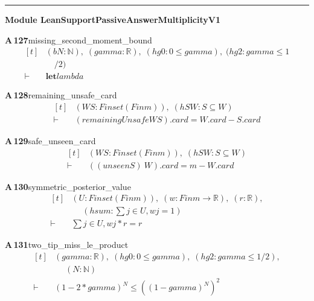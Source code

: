 \documentclass[conference]{IEEEtran}
\theoremstyle{definition}
\newcommand{\lean}[1]{\textsf{\footnotesize #1}}
\begin{document}
\vspace{4pt}\noindent\rule{\columnwidth}{0.4pt}\par\vspace{2pt}
\noindent\textbf{Module \lean{LeanSupportPassiveAnswerMultiplicityV1}}\par\vspace{3pt}

\noindent\textbf{A\,127}\quad\lean{missing\_second\_moment\_bound}
{\footnotesize\[ \begin{aligned}[t]
&(\mathit{b} \mathit{N} : \mathbb{N} ),\; (\mathit{gamma} : \mathbb{R} ),\; (\mathit{hg0} : 0\leq \mathit{gamma}),\; (\mathit{hg2} : \mathit{gamma}\leq 1\\
&\quad /2)\\
\vdash\;&\mathbf{let} \mathit{lambda}
\end{aligned} \]}

\noindent\textbf{A\,128}\quad\lean{remaining\_unsafe\_card}
{\footnotesize\[ \begin{aligned}[t]
&(\mathit{W} \mathit{S} : \mathit{Finset} (\mathit{Fin} \mathit{m})),\; (\mathit{hSW} : \mathit{S} \subseteq \mathit{W})\\
\vdash\;&(\mathit{remainingUnsafe} \mathit{W} \mathit{S}).\mathit{card}=\mathit{W}.\mathit{card}-\mathit{S}.\mathit{card}
\end{aligned} \]}

\noindent\textbf{A\,129}\quad\lean{safe\_unseen\_card}
{\footnotesize\[ \begin{aligned}[t]
&(\mathit{W} \mathit{S} : \mathit{Finset} (\mathit{Fin} \mathit{m})),\; (\mathit{hSW} : \mathit{S} \subseteq \mathit{W})\\
\vdash\;&((\mathit{unseen} \mathit{S}) \ \mathit{W}).\mathit{card}=\mathit{m}-\mathit{W}.\mathit{card}
\end{aligned} \]}

\noindent\textbf{A\,130}\quad\lean{symmetric\_posterior\_value}
{\footnotesize\[ \begin{aligned}[t]
&(\mathit{U} : \mathit{Finset} (\mathit{Fin} \mathit{m})),\; (\mathit{w} : \mathit{Fin} \mathit{m} \to \mathbb{R} ),\; (\mathit{r} : \mathbb{R} ),\\
&\quad \; (\mathit{hsum} : \textstyle\sum \mathit{j} \in \mathit{U},\mathit{w} \mathit{j}=1)\\
\vdash\;&\textstyle\sum \mathit{j} \in \mathit{U},\mathit{w} \mathit{j}*\mathit{r}=\mathit{r}
\end{aligned} \]}

\noindent\textbf{A\,131}\quad\lean{two\_tip\_miss\_le\_product}
{\footnotesize\[ \begin{aligned}[t]
&(\mathit{gamma} : \mathbb{R} ),\; (\mathit{hg0} : 0\leq \mathit{gamma}),\; (\mathit{hg2} : \mathit{gamma}\leq 1/2),\\
&\quad \; (\mathit{N} : \mathbb{N} )\\
\vdash\;&(1-2*\mathit{gamma})^{\mathit{N}} \leq ((1-\mathit{gamma})^{\mathit{N}})^{2}
\end{aligned} \]}
\end{document}
